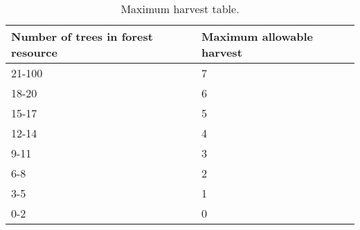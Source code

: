\begin{table}[htbp!]
  \centering
  \caption{Maximum harvest table.}\label{tab:1}
  \begin{tabular}{ll}
    \toprule
    Number of trees in forest resource & Maximum allowable harvest \\
    \midrule
    21-100 & 7 \\
    18-20 & 6  \\
    15-17 & 5 \\
    12-14 & 4 \\
    9-11 & 3 \\
    6-8 & 2 \\
    3-5 & 1 \\
    0-2 & 0 \\
    \bottomrule
  \end{tabular}
\end{table}
